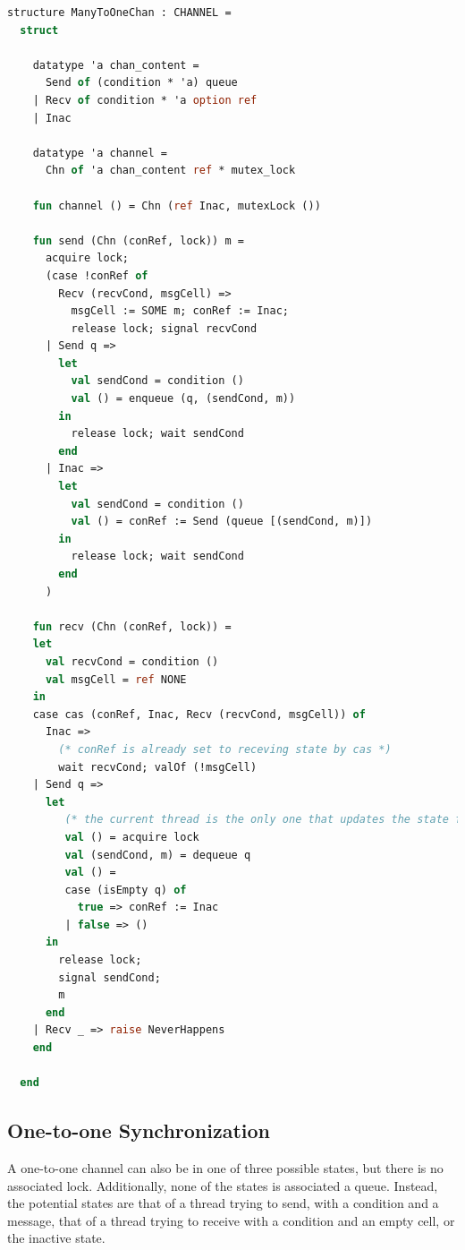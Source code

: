 \documentclass[10pt]{article}
\begin{document}
\begin{lstlisting}[language=ML, mathescape]
  structure ManyToOneChan : CHANNEL =
  struct

    datatype 'a chan_content =
      Send of (condition * 'a) queue
    | Recv of condition * 'a option ref
    | Inac

    datatype 'a channel =
      Chn of 'a chan_content ref * mutex_lock

    fun channel () = Chn (ref Inac, mutexLock ())

    fun send (Chn (conRef, lock)) m = 
      acquire lock;
      (case !conRef of
        Recv (recvCond, msgCell) => 
          msgCell := SOME m; conRef := Inac;
          release lock; signal recvCond
      | Send q =>
        let
          val sendCond = condition ()
          val () = enqueue (q, (sendCond, m))
        in
          release lock; wait sendCond
        end
      | Inac =>
        let
          val sendCond = condition ()
          val () = conRef := Send (queue [(sendCond, m)])
        in
          release lock; wait sendCond
        end 
      )

    fun recv (Chn (conRef, lock)) =
    let
      val recvCond = condition () 
      val msgCell = ref NONE 
    in
    case cas (conRef, Inac, Recv (recvCond, msgCell)) of
      Inac =>
        (* conRef is already set to receving state by cas *)
        wait recvCond; valOf (!msgCell)
    | Send q =>
      let
         (* the current thread is the only one that updates the state from this state *)
         val () = acquire lock
         val (sendCond, m) = dequeue q 
         val () =
         case (isEmpty q) of
           true => conRef := Inac
         | false => ()
      in
        release lock;
        signal sendCond;
        m
      end
    | Recv _ => raise NeverHappens
    end
          
  end

\end{lstlisting}

\subsection{One-to-one Synchronization}

A one-to-one channel can also be in one of three possible states, but there is no associated
lock. Additionally, none of the states is associated a queue. Instead, the potential states are
that of a thread trying to send, with a condition and a message, that of a
thread trying to receive with a condition and an empty cell, or the inactive state.
\end{document}
